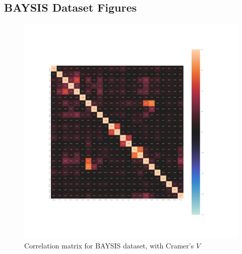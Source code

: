 \documentclass[a4paper,12pt]{report}
\newcommand{\nocontentsline}[3]{}
\newcommand{\tocless}[2]{\bgroup\let\addcontentsline=\nocontentsline#1{#2}\egroup}
\begin{document}
\begin{appendices}

\chapter{BAYSIS Dataset Figures}
\label{appendix_baysis}

\begin{figure}[h]
	\centering
	\includegraphics[scale=0.4]{../CorrAnalysis/data/BAYSIS/01_dataset/plots/baysis_dataset_corr_cramers}
	\caption{Correlation matrix for BAYSIS dataset, with Cramer's $V$}
	\label{img:appendix_correlation_matrix_dataset_cramers}
\end{figure}
\restoregeometry


\end{appendices}
\end{document}
